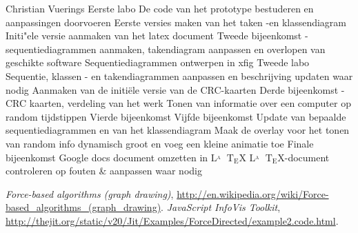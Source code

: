 \documentclass[a4paper,oneside]{report}
\def\latex{$\mathrm{L\!\!^{{}_{\scriptstyle A}} \!\!\!\!\!\;\; T\!_{\displaystyle E} \!
X}$}
\begin{document}
\begin{studentlog}{Christian Vuerings}
{Eerste labo}
{De code van het prototype bestuderen en aanpassingen doorvoeren}
{Eerste versies maken van het taken -en klassendiagram}
{Initi"ele versie aanmaken van het latex document}
{Tweede bijeenkomst - sequentiediagrammen aanmaken, takendiagram aanpassen en overlopen van geschikte software}
{Sequentiediagrammen ontwerpen in xfig}
{Tweede labo}
{Sequentie, klassen - en takendiagrammen aanpassen en beschrijving updaten waar nodig}
{Aanmaken van de initiële versie van de CRC-kaarten}
{Derde bijeenkomst - CRC kaarten, verdeling van het werk}
{Tonen van informatie over een computer op random tijdstippen}   
{Vierde bijeenkomst}
{Vijfde bijeenkomst}
{Update van bepaalde sequentiediagrammen en van het klassendiagram}
{Maak de overlay voor het tonen van random info dynamisch groot en voeg een kleine animatie toe}
{Finale bijeenkomst}
{Google docs document omzetten in \latex}
{\latex -document controleren op fouten \& aanpassen waar nodig}
\end{studentlog}

\noindent
%
%
\def\bibname{Literatuurlijst}
%
\begin{thebibliography}{9}
%
%
\addcontentsline{toc}{chapter}{\bibname}
 \emph{Force-based algorithms (graph drawing)},
\url{http://en.wikipedia.org/wiki/Force-based_algorithms_(graph_drawing)}.
 \emph{JavaScript InfoVis Toolkit}, \url{http://thejit.org/static/v20/Jit/Examples/ForceDirected/example2.code.html}.
\end{thebibliography}
\end{document}

